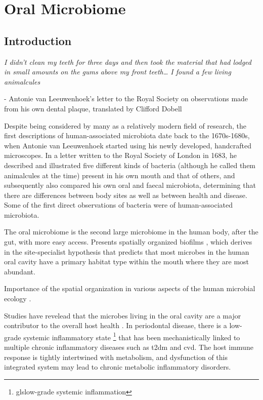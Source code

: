 \chapter{Oral Microbiome}\label{chp:oral_microbiome}

\minitoc

\section{Introduction}
\epigraph{\emph{I didn't clean my teeth for three days and then took the material that had lodged in small amounts on 
the gums above my front teeth… I found a few living animalcules}}{- Antonie van Leeuwenhoek's letter to the Royal Society 
on observations made from his own dental plaque, translated by Clifford Dobell}

Despite being considered by many as a relatively modern field of research, the first descriptions of human-associated 
microbiota date back to the 1670s-1680s, when Antonie van Leeuwenhoek started using his newly developed, handcrafted microscopes. 
In a letter written to the Royal Society of London in 1683, he described and illustrated five different kinds of bacteria 
(although he called them animalcules at the time) present in his own mouth and that of others, and subsequently also 
compared his own oral and faecal microbiota, determining that there are differences between body sites as well as between 
health and disease. Some of the first direct observations of bacteria were of human-associated microbiota.


The oral microbiome is the second large microbiome in the human body, after the gut, with more easy access. Presents spatially organized 
biofilms \cite{Welch2020,Wilbert2020}, which derives in the site-specialist hypothesis that predicts that most microbes 
in the human oral cavity have a primary \gls{habitat} type within the mouth where they are most abundant. 

Importance of the spatial organization in various aspects of the human microbial ecology \cite{Proctor2017}.

Studies have revelead that the microbes living in the oral cavity are a major contributor to the overall host health 
\cite{Hajishengallis2021}. In periodontal disease, there is a low-grade systemic inflammatory state
\footnote{gls{low-grade systemic inflammation}}
that has been mechanistically linked to multiple chronic inflammatory diseases such as \acrfull{t2dm}
and \acrfull{cvd}. The host immune response is tightly intertwined with metabolism,
and dysfunction of this integrated system may lead to chronic metabolic inflammatory disorders.


